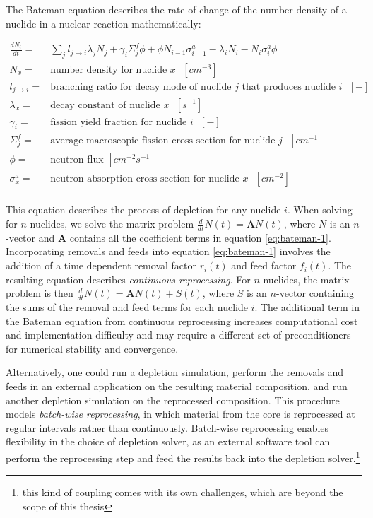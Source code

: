 The Bateman equation describes the rate of change of the number density of a
nuclide in a nuclear reaction mathematically:

\begin{align}
    \label{eq:bateman-1}
    \frac{dN_{i}}{dt} =& \sum_{j} l_{j\to i}\lambda_{j} N_{j} + \gamma_{i} \Sigma^{f}_{j}\phi + \phi N_{i-1} \sigma^{a}_{i-1} - \lambda_{i}N_{i} - N_{i}\sigma^{a}_{i}\phi\\
    N_{x} =& \text{number density for nuclide $x$ $[cm^{-3}]$}\nonumber\\
    l_{j\to i} =& \text{branching ratio for decay mode of nuclide $j$ that produces nuclide $i$ $[-]$}\nonumber\\
    \lambda_{x} =& \text{decay constant of nuclide $x$ $[s^{-1}]$}\nonumber\\
    \gamma_{i} =& \text{fission yield fraction for nuclide $i$ $[-]$}\nonumber \\
    \Sigma^{f}_{j} =& \text{average macroscopic fission cross section for nuclide $j$ $[cm^{-1}]$}\nonumber\\
    \phi =& \text{neutron flux $[cm^{-2}s^{-1}]$}\nonumber\\
    \sigma^{a}_{x} =& \text{neutron absorption cross-section for nuclide $x$ $[cm^{-2}]$}\nonumber\\
\end{align}
    
This equation describes the process of depletion for any nuclide $i$. When
solving for $n$ nuclides, we solve the matrix problem
$\frac{d}{dt}N(t) = \mathbf{A}N(t)$, where $N$ is an $n$-vector and
$\mathbf{A}$ contains all the coefficient terms in equation \ref{eq:bateman-1}.
Incorporating removals and feeds into equation \ref{eq:bateman-1} involves the
addition of a time dependent removal factor $r_{i}(t)$ and feed factor
$f_{i}(t)$. The resulting equation describes {\it continuous reprocessing}.
For $n$ nuclides, the matrix problem is then
$\frac{d}{dt}N(t) = \mathbf{A}N(t) + S(t)$, where $S$ is an $n$-vector
containing the sums of the removal and feed terms for each nuclide $i$. The
additional term in the Bateman equation from continuous reprocessing increases
computational cost and implementation difficulty and may require a different
set of preconditioners for numerical stability and convergence.

Alternatively, one could run a depletion simulation, perform the removals and
feeds in an external application on the resulting material composition, and run
another depletion simulation on the reprocessed composition. This procedure
models {\it batch-wise reprocessing}, in which material from the core is
reprocessed at regular intervals rather than continuously. Batch-wise
reprocessing enables flexibility in the choice of depletion solver, as an
external software tool can perform the reprocessing step and feed the results
back into the depletion solver.\footnote{this kind of coupling comes with its
own challenges, which are beyond the scope of this thesis}

